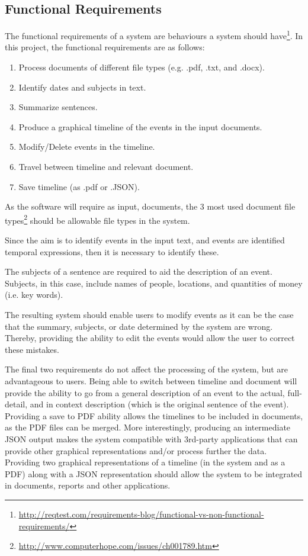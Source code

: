\subsection{Functional Requirements}
\par The functional requirements of a system are behaviours a system should have\footnote{\url{http://reqtest.com/requirements-blog/functional-vs-non-functional-requirements/}}. In this project, the functional requirements are as follows:
\begin{enumerate}
\item Process documents of different file types (e.g. .pdf, .txt, and .docx).
\item Identify dates and subjects in text.
\item Summarize sentences.
\item Produce a graphical timeline of the events in the input documents.
\item Modify/Delete events in the timeline.
\item Travel between timeline and relevant document.
\item Save timeline (as .pdf or .JSON).
\end{enumerate} 
\par As the software will require as input, documents, the 3 most used document file types\footnote{\url{http://www.computerhope.com/issues/ch001789.htm}} should be allowable file types in the system. 
\par Since the aim is to identify events in the input text, and events are identified temporal expressions, then it is necessary to identify these.
\par The subjects of a sentence are required to aid the description of an event. Subjects, in this case, include names of people, locations, and quantities of money (i.e. key words).
\par The resulting system should enable users to modify events as it can be the case that the summary, subjects, or date determined by the system are wrong. Thereby, providing the ability to edit the events would allow the user to correct these mistakes. 
\par The final two requirements do not affect the processing of the system, but are advantageous to users. Being able to switch between timeline and document will provide the ability to go from a general description of an event to the actual, full-detail, and in context description (which is the original sentence of the event). Providing a save to PDF ability allows the timelines to be included in documents, as the PDF files can be merged. More interestingly, producing an intermediate JSON output makes the system compatible with 3rd-party applications that can provide other graphical representations and/or process further the data. Providing two graphical representations of a timeline (in the system and as a PDF) along with a JSON representation should allow the system to be integrated in documents, reports and other applications.

